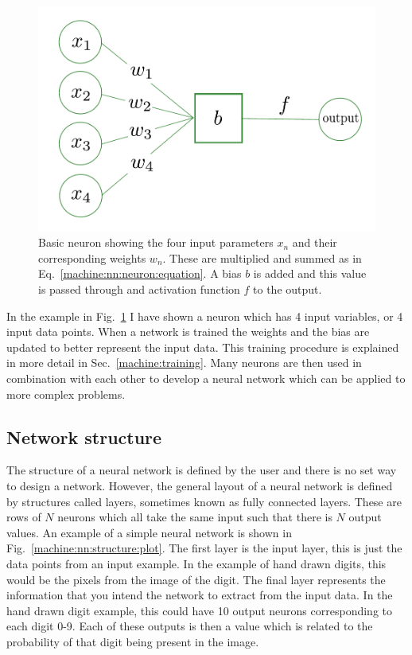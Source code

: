 \begin{figure}[ht]
    \centering
    \includegraphics[width=0.6\columnwidth]{C4_cnn/neuron.pdf}
    \caption[Basic neuron]{Basic neuron showing the four input parameters $x_n$ and their corresponding weights $w_n$. These are multiplied and summed as in Eq.~\ref{machine:nn:neuron:equation}. A bias $b$ is added and this value is passed through and activation function $f$ to the output.}
    \label{machine:nn:neuron:plot}
\end{figure}

In the example in Fig.~\ref{machine:nn:neuron:plot} I have shown a neuron which has 4 input variables, or 4 input data points. 
When a network is trained the weights and the bias are updated to better represent the input data.
This training procedure is explained in more detail in Sec.~\ref{machine:training}.
Many neurons are then used in combination with each other to develop a neural network which can be applied to more complex problems.

\subsection{\label{machine:nn:structure}Network structure}

The structure of a neural network is defined by the user and there is no set way to design a network.
However, the general layout of a neural network is defined by structures called layers, sometimes known as fully connected layers. 
These are rows of $N$ neurons which all take the same input such that there is $N$ output values.
An example of a simple neural network is shown in Fig.~\ref{machine:nn:structure:plot}.
The first layer is the input layer, this is just the data points from an input example.
In the example of hand drawn digits, this would be the pixels from the image of the digit.
The final layer represents the information that you intend the network to extract from the input data. 
In the hand drawn digit example, this could have 10 output neurons corresponding to each digit 0-9. 
Each of these outputs is then a value which is related to the probability of that digit being present in the image.  

